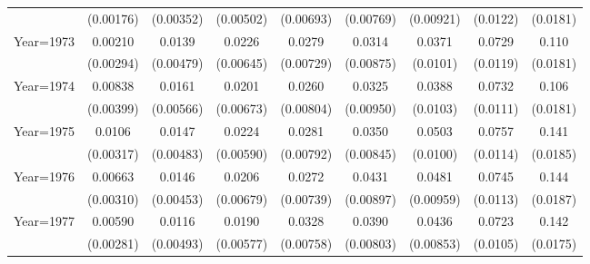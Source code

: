 \begin{table}[htbp]
\begin{tabular}{l*{8}{c}}
                    &   (0.00176)         &   (0.00352)         &   (0.00502)         &   (0.00693)         &   (0.00769)         &   (0.00921)         &    (0.0122)         &    (0.0181)         \\
[1em]
Year=1973           &     0.00210         &      0.0139\sym{***}&      0.0226\sym{***}&      0.0279\sym{***}&      0.0314\sym{***}&      0.0371\sym{***}&      0.0729\sym{***}&       0.110\sym{***}\\
                    &   (0.00294)         &   (0.00479)         &   (0.00645)         &   (0.00729)         &   (0.00875)         &    (0.0101)         &    (0.0119)         &    (0.0181)         \\
[1em]
Year=1974           &     0.00838\sym{**} &      0.0161\sym{***}&      0.0201\sym{***}&      0.0260\sym{***}&      0.0325\sym{***}&      0.0388\sym{***}&      0.0732\sym{***}&       0.106\sym{***}\\
                    &   (0.00399)         &   (0.00566)         &   (0.00673)         &   (0.00804)         &   (0.00950)         &    (0.0103)         &    (0.0111)         &    (0.0181)         \\
[1em]
Year=1975           &      0.0106\sym{***}&      0.0147\sym{***}&      0.0224\sym{***}&      0.0281\sym{***}&      0.0350\sym{***}&      0.0503\sym{***}&      0.0757\sym{***}&       0.141\sym{***}\\
                    &   (0.00317)         &   (0.00483)         &   (0.00590)         &   (0.00792)         &   (0.00845)         &    (0.0100)         &    (0.0114)         &    (0.0185)         \\
[1em]
Year=1976           &     0.00663\sym{**} &      0.0146\sym{***}&      0.0206\sym{***}&      0.0272\sym{***}&      0.0431\sym{***}&      0.0481\sym{***}&      0.0745\sym{***}&       0.144\sym{***}\\
                    &   (0.00310)         &   (0.00453)         &   (0.00679)         &   (0.00739)         &   (0.00897)         &   (0.00959)         &    (0.0113)         &    (0.0187)         \\
[1em]
Year=1977           &     0.00590\sym{**} &      0.0116\sym{**} &      0.0190\sym{***}&      0.0328\sym{***}&      0.0390\sym{***}&      0.0436\sym{***}&      0.0723\sym{***}&       0.142\sym{***}\\
                    &   (0.00281)         &   (0.00493)         &   (0.00577)         &   (0.00758)         &   (0.00803)         &   (0.00853)         &    (0.0105)         &    (0.0175)         \\

\end{tabular}
\end{table}
